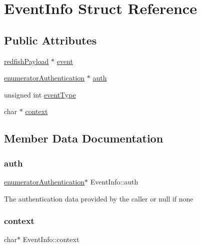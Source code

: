 \hypertarget{structEventInfo}{}\section{Event\+Info Struct Reference}
\label{structEventInfo}
\subsection*{Public Attributes}
\begin{DoxyCompactItemize}
\item 
\hyperlink{structredfishPayload}{redfish\+Payload} $\ast$ \hyperlink{structEventInfo_a1accd6f1a75475fbff4aafd612c56343}{event}
\item 
\hyperlink{structenumeratorAuthentication}{enumerator\+Authentication} $\ast$ \hyperlink{structEventInfo_a6d3cf4fe002a50cab93fc1d85a1a8047}{auth}
\item 
unsigned int \hyperlink{structEventInfo_a5b1252707a2300785198051c0d8dd953}{event\+Type}
\item 
char $\ast$ \hyperlink{structEventInfo_a2a2491eaacf241bd58419fb7eefc9abe}{context}
\end{DoxyCompactItemize}


\subsection{Member Data Documentation}
\mbox{\label{structEventInfo_a6d3cf4fe002a50cab93fc1d85a1a8047}} 
\subsubsection{\texorpdfstring{auth}{auth}}
{\footnotesize\ttfamily \hyperlink{structenumeratorAuthentication}{enumerator\+Authentication}$\ast$ Event\+Info\+::auth}

The authentication data provided by the caller or null if none \mbox{\label{structEventInfo_a2a2491eaacf241bd58419fb7eefc9abe}} 
\subsubsection{\texorpdfstring{context}{context}}
{\footnotesize\ttfamily char$\ast$ Event\+Info\+::context}

